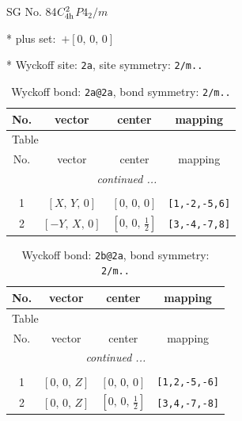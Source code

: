 \documentclass[fleqn,8pt]{jsarticle}
\begin{document}
\setcounter{MaxMatrixCols}{32}

\renewcommand{\tablename}{Table~}
\renewcommand{\figurename}{Figure~}
\begin{center}
\LARGE
SG No. 84\quad$C_{\rm 4h}^{2}$\quad$P4_2/m$\quad[ tetragonal ]
\end{center}

* plus set:\,\,\,$+\left[ 0,\, 0,\, 0 \right]$


* Wyckoff site: {\tt 2a}, site symmetry: {\tt 2/m..}
\renewcommand{\arraystretch}{1.2}
\begin{longtable}{cccc}
\caption{Wyckoff bond: {\tt 2a@2a}, bond symmetry: {\tt 2/m..}}
 \\
 \hline \hline
No. & vector & center & mapping \\ \hline \endfirsthead

\multicolumn{3}{l}{\tablename\ \thetable{}} \\
 \hline \hline
No. & vector & center & mapping \\ \hline \endhead

 \hline \hline
\multicolumn{3}{r}{\footnotesize\it continued ...} \\ \endfoot

 \hline \hline
\multicolumn{3}{r}{} \\ \endlastfoot

1 & $\left[ X,\, Y,\, 0 \right]$ & $\left[ 0,\, 0,\, 0 \right]$ & {\tt [1,-2,-5,6]} \\ \hline
2 & $\left[ - Y,\, X,\, 0 \right]$ & $\left[ 0,\, 0,\, \frac{1}{2} \right]$ & {\tt [3,-4,-7,8]} \\
\end{longtable}
\renewcommand{\arraystretch}{1.2}
\begin{longtable}{cccc}
\caption{Wyckoff bond: {\tt 2b@2a}, bond symmetry: {\tt 2/m..}}
 \\
 \hline \hline
No. & vector & center & mapping \\ \hline \endfirsthead

\multicolumn{3}{l}{\tablename\ \thetable{}} \\
 \hline \hline
No. & vector & center & mapping \\ \hline \endhead

 \hline \hline
\multicolumn{3}{r}{\footnotesize\it continued ...} \\ \endfoot

 \hline \hline
\multicolumn{3}{r}{} \\ \endlastfoot

1 & $\left[ 0,\, 0,\, Z \right]$ & $\left[ 0,\, 0,\, 0 \right]$ & {\tt [1,2,-5,-6]} \\ \hline
2 & $\left[ 0,\, 0,\, Z \right]$ & $\left[ 0,\, 0,\, \frac{1}{2} \right]$ & {\tt [3,4,-7,-8]} \\
\end{longtable}
\end{document}
